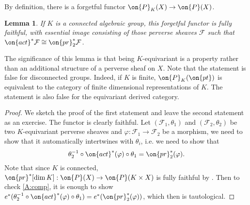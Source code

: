 \documentclass[]{pcmi}
\theoremstyle{plain}
\newtheorem{lem}[equation]{Lemma}
\theoremstyle{remark}
\theoremstyle{definition}
\newcommand{\mF}{{\mathcal F}}
\newcommand{\pr}{{\on{pr}}}
\begin{document}
By definition, there is a forgetful functor $\on{P}_K(X)\to \on{P}(X)$. 
\begin{lem}\label{A:forgetful}
If $K$ is a connected algebraic group, this forgetful functor is fully faithful, with essential image consisting of those perverse sheaves $\mF$ such that $\on{act}^*\mF\cong\pr_2^*\mF$. 
\end{lem}
The significance of this lemma is that being $K$-equivariant is a property rather than an additional structure of a perverse sheaf on $X$. Note that the statement is false for disconnected groups. Indeed, if $K$ is finite, $\on{P}_K(\on{pt})$ is equivalent to the category of finite dimensional representations of $K$. The statement is also false for the equivariant derived category.
\begin{proof}We sketch the proof of the first statement and leave the second statement as an exercise. The functor is clearly faithful. Let $(\mF_1,\theta_1)$ and $(\mF_2,\theta_2)$ be two $K$-equivariant perverse sheaves and $\varphi: \mF_1\to \mF_2$ be a morphism, we need to show that it automatically intertwines with $\theta_i$, i.e. we need to show that
\begin{equation}\label{A:comp}
\theta_2^{-1}\circ\on{act}^*(\varphi)\circ\theta_1=\pr_2^*(\varphi). 
\end{equation}
Note that since $K$ is connected, $\pr^*[\dim K]: \on{P}(X)\to \on{P}(K\times X)$ is fully faithful by \cite[Proposition 4.2.5]{BBD}. Then to check \eqref{A:comp}, it is enough to show $e^*(\theta_2^{-1}\circ\on{act}^*(\varphi)\circ\theta_1)=e^*(\pr_2^*(\varphi))$, which then is tautological.
\end{proof}
\end{document}

